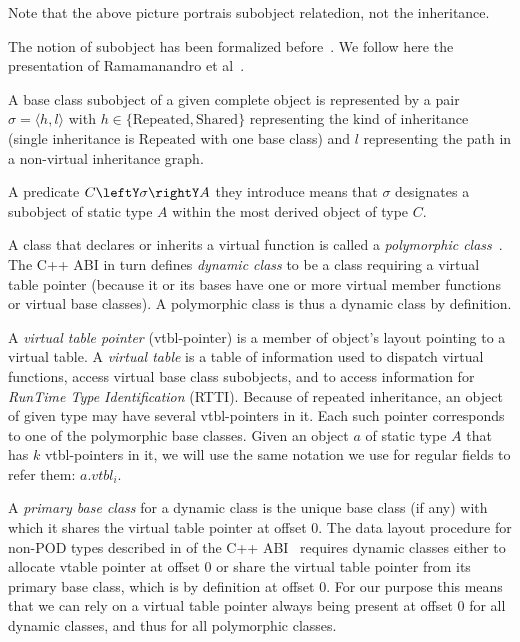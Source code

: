 \documentclass[preprint]{sigplanconf}
\begin{document}
\noindent
Note that the above picture portrais subobject relatedion, not the inheritance.

The notion of subobject has been formalized before~\cite{RF95,WNST06,RDL11}.
We follow here the presentation of Ramamanandro et al~\cite{RDL11}.

A base class subobject of a given complete object is represented by a pair 
$\sigma = \langle h,l\rangle$ with $h \in \{\mathrm{Repeated},\mathrm{Shared}\}$ representing the 
kind of inheritance (single inheritance is $\mathrm{Repeated}$ with one base class) and $l$ 
representing the path in a non-virtual inheritance graph.

A predicate $C\leftY\sigma\rightY A$ they introduce means that $\sigma$ 
designates a subobject of static type $A$ within the most derived object of 
type $C$.

A class that declares or inherits a virtual function is called a 
\emph{polymorphic class}~\cite[]{C++0x}. The C++ ABI in turn defines 
\emph{dynamic class} to be a class requiring a virtual table pointer (because it 
or its bases have one or more virtual member functions or virtual base classes). 
A polymorphic class is thus a dynamic class by definition.

A \emph{virtual table pointer} (vtbl-pointer) is a member of object's layout 
pointing to a virtual table. A \emph{virtual table} is a table of information used 
to dispatch virtual functions, access virtual base class subobjects, and to 
access information for \emph{RunTime Type Identification} (RTTI). Because of repeated
inheritance, an object of given type may have several vtbl-pointers in it. Each 
such pointer corresponds to one of the polymorphic base classes. Given an object 
$a$ of static type $A$ that has $k$ vtbl-pointers in it, we will use the same 
notation we use for regular fields to refer them: $a.vtbl_i$.

A \emph{primary base class} for a dynamic class is the unique base class (if any) 
with which it shares the virtual table pointer at offset 0. The data layout 
procedure for non-POD types described in  of the C++ ABI~\cite{C++ABI} 
requires dynamic classes either to allocate vtable pointer at offset 0 or share 
the virtual table pointer from its primary base class, which is by definition at 
offset 0. For our purpose this means that we can rely on a virtual table pointer 
always being present at offset 0 for all dynamic classes, and thus for all polymorphic 
classes.
\end{document}
